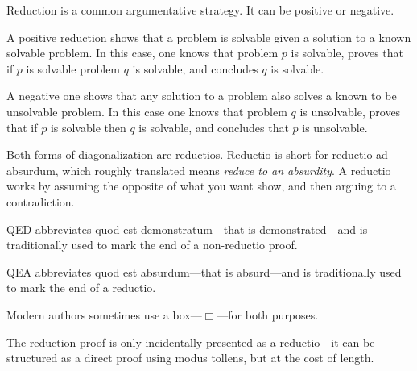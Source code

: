 \documentclass[../../../include/open-logic-section]{subfiles}
\begin{document}

Reduction is a common argumentative strategy. It can be positive or
negative.

A positive reduction shows that a problem is solvable given a solution to a
known solvable problem. In this case, one knows that problem $p$ is
solvable, proves that if $p$ is solvable problem $q$ is solvable, and
concludes $q$ is solvable.

A negative one shows that any solution to a problem also solves a known to
be unsolvable problem. In this case one knows that problem $q$ is
unsolvable, proves that if $p$ is solvable then $q$ is solvable, and
concludes that $p$ is unsolvable.

Both forms of diagonalization are reductios. Reductio is short for reductio
ad absurdum, which roughly translated means \emph{reduce to an absurdity}.
A reductio works by assuming the opposite of what you want show, and then
arguing to a contradiction.

QED abbreviates quod est demonstratum---that is demonstrated---and is
traditionally used to mark the end of a non-reductio proof.

QEA abbreviates quod est absurdum---that is absurd---and is traditionally
used to mark the end of a reductio.

Modern authors sometimes use a box---$\Box$---for both purposes.

The reduction proof is only incidentally presented as a reductio---it can
be structured as a direct proof using modus tollens, but at the cost of
length.
\end{document}
